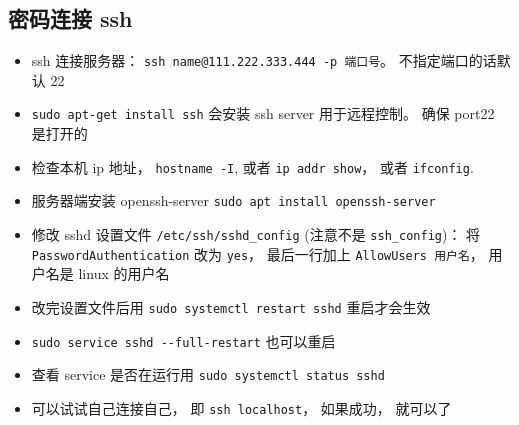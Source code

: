 
\subsection{密码连接 ssh}
\begin{itemize}
\item ssh 连接服务器： \verb|ssh name@111.222.333.444 -p 端口号|。 不指定端口的话默认 22
\item \verb`sudo apt-get install ssh` 会安装 ssh server 用于远程控制。 确保 port22 是打开的
\item 检查本机 ip 地址， \verb`hostname -I`, 或者 \verb`ip addr show`， 或者 \verb|ifconfig|.
\item 服务器端安装 openssh-server \verb`sudo apt install openssh-server`
\item 修改 sshd 设置文件 \verb`/etc/ssh/sshd_config` (注意不是 \verb`ssh_config`)： 将 \verb`PasswordAuthentication` 改为 \verb`yes`， 最后一行加上 \verb`AllowUsers 用户名`， 用户名是 linux 的用户名
\item 改完设置文件后用 \verb`sudo systemctl restart sshd` 重启才会生效
\item \verb|sudo service sshd --full-restart| 也可以重启
\item 查看 service 是否在运行用  \verb`sudo systemctl status sshd`
\item 可以试试自己连接自己， 即 \verb`ssh localhost`， 如果成功， 就可以了
\end{itemize}

